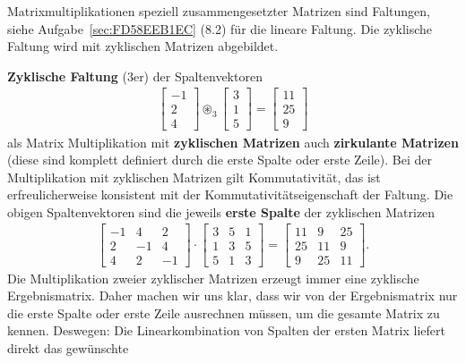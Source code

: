 \newpage
\begin{ExCalc}
Matrixmultiplikationen speziell zusammengesetzter Matrizen sind Faltungen, siehe
Aufgabe~\ref{sec:FD58EEB1EC} (8.2) für die lineare Faltung.
Die zyklische Faltung wird mit zyklischen Matrizen abgebildet.

\textbf{Zyklische Faltung} (3er) der Spaltenvektoren
\begin{align}
\begin{bmatrix}
-1\\2\\4
\end{bmatrix}
\circledast_3
\begin{bmatrix}
3\\1\\5
\end{bmatrix}
=
\begin{bmatrix}
11\\25\\9
\end{bmatrix}
\end{align}
als Matrix Multiplikation mit \textbf{zyklischen Matrizen} auch \textbf{zirkulante Matrizen}
(diese sind komplett definiert durch die erste Spalte oder erste Zeile).
Bei der Multiplikation mit zyklischen Matrizen gilt Kommutativität, das ist erfreulicherweise
konsistent mit der Kommutativitätseigenschaft der Faltung.
%
Die obigen Spaltenvektoren sind die jeweils \textbf{erste Spalte} der zyklischen Matrizen
\begin{align}
\begin{bmatrix}
-1 &  4 &  2\\
 2 & -1 &  4\\
 4 &  2 & -1
\end{bmatrix}
\cdot
\begin{bmatrix}
3 & 5 & 1\\
1 & 3 & 5\\
5 & 1 & 3
\end{bmatrix}
=
\begin{bmatrix}
11  &   9  &  25\\
25  &  11  &  9\\
 9  &  25  &  11
\end{bmatrix}.
\end{align}
%
Die Multiplikation zweier zyklischer Matrizen erzeugt immer eine zyklische Ergebnismatrix.
Daher machen wir uns klar, dass wir von der Ergebnismatrix nur die erste Spalte
oder erste Zeile ausrechnen müssen, um die gesamte Matrix zu kennen.
%
Deswegen: Die Linearkombination von Spalten der ersten Matrix liefert direkt das gewünschte

\end{ExCalc}
